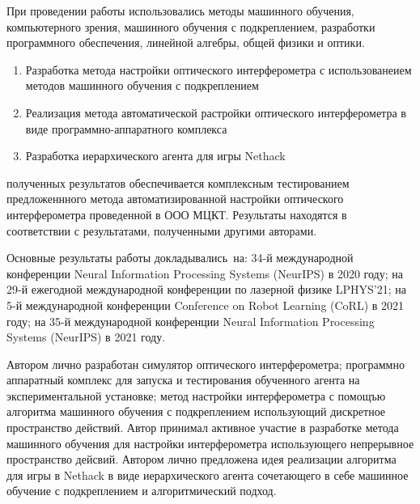 {\methods} При проведении работы использовались методы машинного обучения, компьютерного зрения, машинного обучения с подкреплением, разработки программного обеспечения, линейной алгебры, общей физики и оптики. 

{}
\begin{enumerate}[beginpenalty=10000] %
  \item Разработка метода настройки оптического интерферометра с использованеием методов машинного обучения с подкреплением
  \item Реализация метода автоматической растройки оптического интерферометра в виде программно-аппаратного комплекса
  \item Разработка иерархического агента для игры Nethack
\end{enumerate}

{\reliability} полученных результатов обеспечивается комплексным тестированием предложеннного метода автоматизированной настройки оптического интерферометра проведенной в ООО МЦКТ. 
Результаты находятся в соответствии с результатами, полученными другими авторами.


{\probation}
Основные результаты работы докладывались~на: 34-й международной конференции Neural Information Processing Systems (NeurIPS) в 2020 году; на 29-й ежегодной международной конференции по лазерной физике LPHYS'21; на 5-й международной конференции Conference on Robot Learning (CoRL) в 2021 году; на 35-й международной конференции Neural Information Processing Systems (NeurIPS) в 2021 году.

{\contribution} Автором лично разработан симулятор оптического интерферометра; программно аппаратный комплекс для запуска и тестирования обученного агента на экспериментальной установке; метод настройки интерферометра с помощъю алгоритма машинного обучения с подкреплением использующий дискретное пространство действий. Автор принимал активное участие в разработке метода машинного обучения для настройки интерферометра использующего непрерывное пространство дейсвий. Автором лично предложена идея реализации алгоритма для игры в Nethack в виде иерархического агента сочетающего в себе машинное обучение с подкреплением и алгоритмический подход.  

